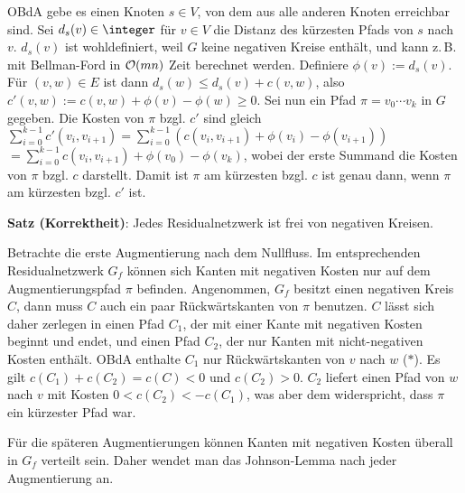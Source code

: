 \begin{Beweis}
    OBdA gebe es einen Knoten $s \in V$, von dem aus alle anderen Knoten erreichbar sind.
    Sei $d_s(v) \in \integer$ für $v \in V$ die Distanz des kürzesten Pfads von $s$ nach $v$.
    $d_s(v)$ ist wohldefiniert, weil $G$ keine negativen Kreise enthält,
    und kann z.\,B. mit Bellman-Ford in $\mathcal{O}(mn)$ Zeit berechnet werden.
    Definiere $\phi(v) := d_s(v)$.
    Für $(v, w) \in E$ ist dann $d_s(w) \le d_s(v) + c(v, w)$, also\\
    $c'(v, w) := c(v, w) + \phi(v) - \phi(w) \ge 0$.
    Sei nun ein Pfad $\pi = v_0 \dotsb v_k$ in $G$ gegeben.
    Die Kosten von $\pi$ bzgl. $c'$ sind gleich
    $\sum_{i=0}^{k-1} c'(v_i, v_{i+1})
    = \sum_{i=0}^{k-1} (c(v_i, v_{i+1}) + \phi(v_i) - \phi(v_{i+1}))$\\
    $= \sum_{i=0}^{k-1} c(v_i, v_{i+1}) + \phi(v_0) - \phi(v_k)$,
    wobei der erste Summand die Kosten von $\pi$ bzgl. $c$ darstellt.
    Damit ist $\pi$ am kürzesten bzgl. $c$ ist genau dann,
    wenn $\pi$ am kürzesten bzgl. $c'$ ist.
\end{Beweis}

\linie

\textbf{Satz (Korrektheit)}:
Jedes Residualnetzwerk ist frei von negativen Kreisen.

\begin{Beweis}
    Betrachte die erste Augmentierung nach dem Nullfluss.
    Im entsprechenden Residualnetzwerk $G_f$ können sich Kanten mit negativen Kosten nur auf dem
    Augmentierungspfad $\pi$ befinden.
    Angenommen, $G_f$ besitzt einen negativen Kreis $C$,
    dann muss $C$ auch ein paar Rückwärtskanten von $\pi$ benutzen.
    $C$ lässt sich daher zerlegen in einen Pfad $C_1$,
    der mit einer Kante mit negativen Kosten beginnt und endet,
    und einen Pfad $C_2$, der nur Kanten mit nicht-negativen Kosten enthält.
    OBdA enthalte $C_1$ nur Rückwärtskanten von $v$ nach $w$ ($\ast$).
    Es gilt $c(C_1) + c(C_2) = c(C) < 0$ und $c(C_2) > 0$.
    $C_2$ liefert einen Pfad von $w$ nach $v$ mit Kosten $0 < c(C_2) < -c(C_1)$,
    was aber dem widerspricht, dass $\pi$ ein kürzester Pfad war.
    
    Für die späteren Augmentierungen können Kanten mit negativen Kosten überall in $G_f$ verteilt
    sein.
    Daher wendet man das Johnson-Lemma nach jeder Augmentierung an.
\end{Beweis}

\linie
\pagebreak

